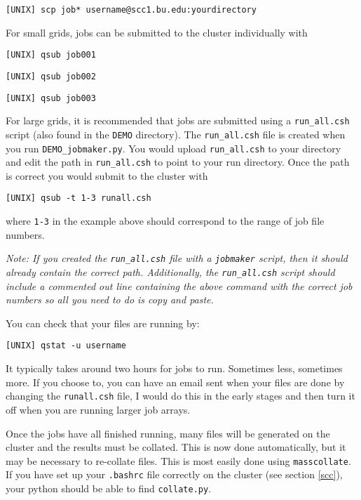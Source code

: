 \documentclass{article}
\begin{document}
\vspace{2mm}
\texttt{[UNIX] scp job* username@scc1.bu.edu:yourdirectory}
\vspace{2mm}

\noindent For small grids, jobs can be submitted to the cluster individually with

\vspace{2mm}
\texttt{[UNIX] qsub job001}

\texttt{[UNIX] qsub job002}

\texttt{[UNIX] qsub job003}
\vspace{2mm}

\noindent For large grids, it is recommended that jobs are submitted using a \texttt{run\_all.csh} script (also found in the \texttt{DEMO} directory). 
The \texttt{run\_all.csh} file is created when you run  \texttt{DEMO\_jobmaker.py}. 
You would upload \texttt{run\_all.csh} to your directory and edit the path in \texttt{run\_all.csh} to point to your run directory.  Once the path is correct you would submit to the cluster with

\vspace{2mm}
\texttt{[UNIX] qsub -t 1-3 runall.csh}
\vspace{2mm}

\noindent where \texttt{1-3} in the example above should correspond to the range of job file numbers. 
\vspace{2mm}

\noindent \textit{Note: If you created the \texttt{run\_all.csh} file with a \texttt{jobmaker} script, then it should already contain the correct path. Additionally, the \texttt{run\_all.csh} script should include a commented out line containing the above command with the correct job numbers so all you need to do is copy and paste.}
\vspace{2mm}

You can check that your files are running by: 

\vspace{2mm}
\texttt{[UNIX] qstat -u username}
\vspace{2mm}

\noindent It typically takes around two hours for jobs to run. Sometimes less, sometimes more. If you choose to, you can have an email sent when your files are done by changing the \texttt{runall.csh} file, I would do this in the early stages and then turn it off when you are running larger job arrays. 

\noindent Once the jobs have all finished running, many files will be generated on the cluster and the results must be collated. This is now done automatically, but it may be necessary to re-collate files. This is most easily done using \texttt{masscollate}. If you have set up your \texttt{.bashrc} file correctly on the cluster (see section \ref{scc}), your python should be able to find \texttt{collate.py}.
\end{document}

